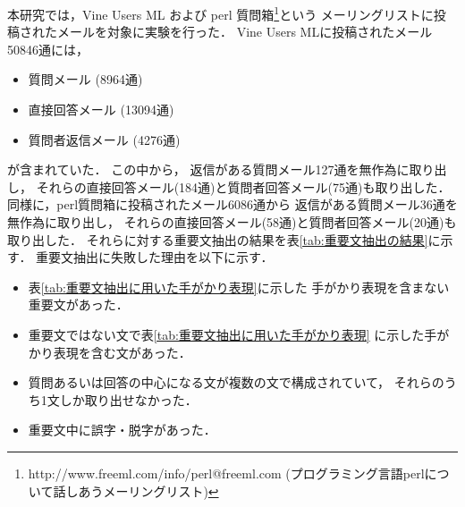   本研究では，Vine Users ML および
  perl 質問箱\footnote{http://www.freeml.com/info/perl@freeml.com
  (プログラミング言語perlについて話しあうメーリングリスト)}という
  メーリングリストに投稿されたメールを対象に実験を行った．
  Vine Users MLに投稿されたメール50846通には，
   \begin{itemize}
    \item 質問メール (8964通)
    \item 直接回答メール (13094通)
    \item 質問者返信メール (4276通)
   \end{itemize}
   が含まれていた．
   この中から，
   返信がある質問メール127通を無作為に取り出し，
   それらの直接回答メール(184通)と質問者回答メール(75通)も取り出した．
   同様に，perl質問箱に投稿されたメール6086通から
   返信がある質問メール36通を無作為に取り出し，
   それらの直接回答メール(58通)と質問者回答メール(20通)も取り出した．
   それらに対する重要文抽出の結果を表\ref{tab:重要文抽出の結果}に示す．
   重要文抽出に失敗した理由を以下に示す．
   \begin{itemize}
    \item 表\ref{tab:重要文抽出に用いた手がかり表現}に示した
	  手がかり表現を含まない重要文があった．

    \item 重要文ではない文で表\ref{tab:重要文抽出に用いた手がかり表現}
	  に示した手がかり表現を含む文があった．

    \item 質問あるいは回答の中心になる文が複数の文で構成されていて，
	  それらのうち1文しか取り出せなかった．

    \item 重要文中に誤字・脱字があった．

   \end{itemize}

